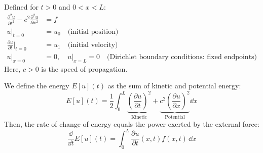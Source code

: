\begin{center}
\end{center}

\begin{definition}
Defined for $t > 0$ and $0 < x < L$:
\begin{align*}
    \frac{\partial^2 u}{\partial t^2} - c^2 \frac{\partial^2 u}{\partial x^2} &= f \\[1ex]
    u|_{t=0} &= u_0 \quad \text{(initial position)} \\
    \frac{\partial u}{\partial t}\bigg|_{t=0} &= u_1 \quad \text{(initial velocity)} \\[1ex]
    u|_{x=0} &= 0, \quad u|_{x=L} = 0 \quad \text{(Dirichlet boundary conditions: fixed endpoints)}
\end{align*}
Here, $c > 0$ is the speed of propagation.
\end{definition}

\begin{proposition}
We define the energy $E[u](t)$ as the sum of kinetic and potential energy:
\begin{equation*}
    E[u](t) = \frac{1}{2} \int_0^L \underbrace{\left(\frac{\partial u}{\partial t}\right)^2}_{\text{Kinetic}} + \underbrace{c^2 \left(\frac{\partial u}{\partial x}\right)^2}_{\text{Potential}} \dd x
\end{equation*}
Then, the rate of change of energy equals the power exerted by the external force:
\begin{equation*}
    \frac{\dd}{\dd t} E[u](t) = \int_0^L \frac{\partial u}{\partial t}(x,t) f(x,t) \, \dd x
\end{equation*}
\end{proposition}

